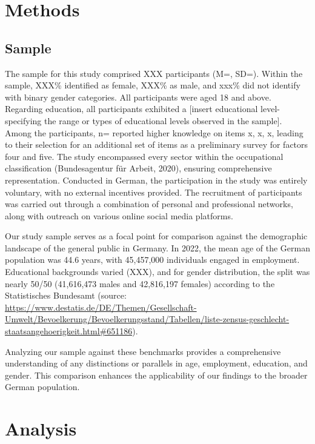 \documentclass[
  12pt,
  a4paper,
  twoside]{article}
\begin{document}
\hypertarget{methods-1}{%
\section{Methods}\label{methods-1}}

\hypertarget{sample}{%
\subsection{Sample}\label{sample}}

The sample for this study comprised XXX participants (M=, SD=). Within the sample, XXX\% identified as female, XXX\% as male, and xxx\% did not identify with binary gender categories. All participants were aged 18 and above. Regarding education, all participants exhibited a {[}insert educational level- specifying the range or types of educational levels observed in the sample{]}. Among the participants, n= reported higher knowledge on items x, x, x, leading to their selection for an additional set of items as a preliminary survey for factors four and five.
The study encompassed every sector within the occupational classification (Bundesagentur für Arbeit, 2020), ensuring comprehensive representation. Conducted in German, the participation in the study was entirely voluntary, with no external incentives provided. The recruitment of participants was carried out through a combination of personal and professional networks, along with outreach on various online social media platforms.

Our study sample serves as a focal point for comparison against the demographic landscape of the general public in Germany. In 2022, the mean age of the German population was 44.6 years, with 45,457,000 individuals engaged in employment. Educational backgrounds varied (XXX), and for gender distribution, the split was nearly 50/50 (41,616,473 males and 42,816,197 females) according to the Statistisches Bundesamt (source: \url{https://www.destatis.de/DE/Themen/Gesellschaft-Umwelt/Bevoelkerung/Bevoelkerungsstand/Tabellen/liste-zensus-geschlecht-staatsangehoerigkeit.html\#651186}).

Analyzing our sample against these benchmarks provides a comprehensive understanding of any distinctions or parallels in age, employment, education, and gender. This comparison enhances the applicability of our findings to the broader German population.

\hypertarget{analysis}{%
\section*{Analysis}\label{analysis}}
\end{document}
